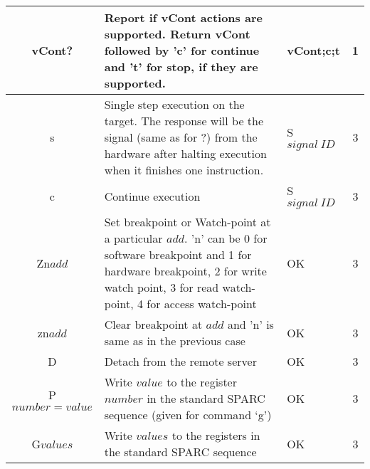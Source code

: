 \begin{longtable}{c |m{6.5cm} |m{3.5cm} |c}
vCont? &  Report if vCont actions are supported. Return vCont followed by 'c' for continue and 't' for stop, if they are supported. & vCont;c;t & 1\\
\hline

s& Single step execution on the target. The response will be the signal (same as for ?) from the hardware after halting execution when it finishes one instruction. & S $signal\:ID$ & 3\\
\hline

c & Continue execution & S $signal\:ID$ & 3\\
\hline

Zn$add$& Set breakpoint or Watch-point at a particular $add$. 'n' can be 0 for software breakpoint and 1 for hardware breakpoint, 2 for write watch point, 3 for read watch-point, 4 for access watch-point & OK & 3\\
\hline

zn$add$& Clear breakpoint at $add$ and 'n' is same as in the previous case & OK & 3\\
\hline

D & Detach from the remote server & OK & 3\\
\hline

P$number=value$ &Write $value$ to the register $number$ in the standard SPARC sequence (given for command `g') & OK & 3\\
\hline

G$values$ & Write $values$ to the registers in the standard SPARC sequence& OK & 3\\
\hline
\hline

\end{longtable}